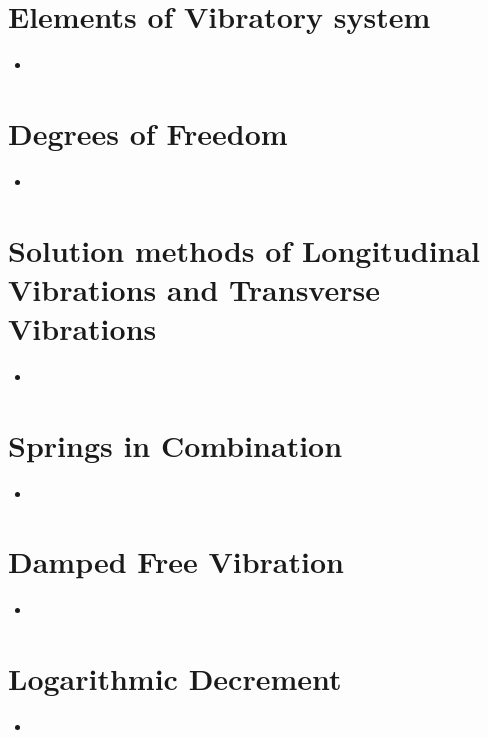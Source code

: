 \documentclass[8pt]{report}
\begin{document}
\section{Elements of Vibratory system}
	\begin{itemize}
		\item
	\end{itemize}\hrulefill
\section{Degrees of Freedom}
	\begin{itemize}
		\item
	\end{itemize}\hrulefill
\section{Solution methods of Longitudinal Vibrations and Transverse Vibrations}
	\begin{itemize}
		\item
	\end{itemize}\hrulefill
\section{Springs in Combination}
	\begin{itemize}
		\item
	\end{itemize}\hrulefill
\section{Damped Free Vibration}
	\begin{itemize}
		\item
	\end{itemize}\hrulefill
\section{Logarithmic Decrement}
	\begin{itemize}
		\item
	\end{itemize}\hrulefill
\end{document}
